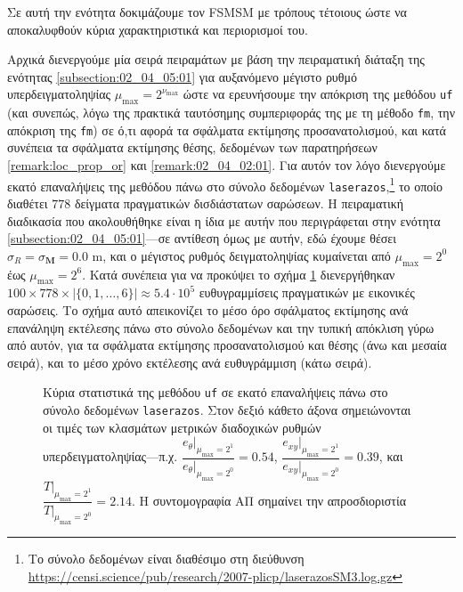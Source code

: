 Σε αυτή την ενότητα δοκιμάζουμε τον FSMSM με τρόπους τέτοιους ώστε να
αποκαλυφθούν κύρια χαρακτηριστικά και περιορισμοί του.

Αρχικά διενεργούμε μία σειρά πειραμάτων με βάση την πειραματική διάταξη της
ενότητας \ref{subsection:02_04_05:01} για αυξανόμενο μέγιστο ρυθμό
υπερδειγματοληψίας $\mu_{\max} = 2^{\nu_{\max}}$ ώστε να ερευνήσουμε την
απόκριση της μεθόδου \texttt{uf} (και συνεπώς, λόγω της πρακτικά ταυτόσημης
συμπεριφοράς της με τη μέθοδο \texttt{fm}, την απόκριση της \texttt{fm}) σε
ό,τι αφορά τα σφάλματα εκτίμησης προσανατολισμού, και κατά συνέπεια τα σφάλματα
εκτίμησης θέσης, δεδομένων των παρατηρήσεων \ref{remark:loc_prop_or} και
\ref{remark:02_04_02:01}. Για αυτόν τον λόγο διενεργούμε εκατό επαναλήψεις της
μεθόδου πάνω στο σύνολο δεδομένων \texttt{laserazos},\footnote{Το σύνολο
δεδομένων είναι διαθέσιμο στη διεύθυνση
\url{https://censi.science/pub/research/2007-plicp/laserazosSM3.log.gz}} το
οποίο διαθέτει $778$ δείγματα πραγματικών δισδιάστατων σαρώσεων. Η πειραματική
διαδικασία που ακολουθήθηκε είναι η ίδια με αυτήν που περιγράφεται στην ενότητα
\ref{subsection:02_04_05:01}---σε αντίθεση όμως με αυτήν, εδώ έχουμε θέσει
$\sigma_R = \sigma_{\bm{M}} = 0.0$ m, και ο μέγιστος ρυθμός δειγματοληψίας
κυμαίνεται από $\mu_{\max} = 2^0$ έως $\mu_{\max} = 2^6$. Κατά συνέπεια για να
προκύψει το σχήμα \ref{fig:02_04_06:01} διενεργήθηκαν $100 \times 778 \times
|\{0,1,\dots,6\}| \approx 5.4\cdot 10^5$ ευθυγραμμίσεις πραγματικών με εικονικές
σαρώσεις. Το σχήμα αυτό απεικονίζει το μέσο όρο σφάλματος εκτίμησης ανά
επανάληψη εκτέλεσης πάνω στο σύνολο δεδομένων και την τυπική απόκλιση γύρω από
αυτόν, για τα σφάλματα εκτίμησης προσανατολισμού και θέσης (άνω και μεσαία
σειρά), και το μέσο χρόνο εκτέλεσης ανά ευθυγράμμιση (κάτω σειρά).

\begin{figure}\centering
  
  \caption{\small Κύρια στατιστικά της μεθόδου \texttt{uf} σε εκατό επαναλήψεις
           πάνω στο σύνολο δεδομένων \texttt{laserazos}. Στον δεξιό κάθετο άξονα
           σημειώνονται οι τιμές των κλασμάτων μετρικών διαδοχικών ρυθμών
           υπερδειγματοληψίας---π.χ.
           $\dfrac{e_{\theta}|_{\mu_{\max} = 2^1}}{e_{\theta}|_{\mu_{\max} = 2^0}} = 0.54$,
           $\dfrac{e_{xy}|_{\mu_{\max} = 2^1}}{e_{xy}|_{\mu_{\max} = 2^0}} = 0.39$,
           και $\dfrac{T|_{\mu_{\max} = 2^1}}{T|_{\mu_{\max} = 2^0}} = 2.14$. Η
           συντομογραφία ΑΠ σημαίνει την απροσδιοριστία}
  \label{fig:02_04_06:01}
\end{figure}

